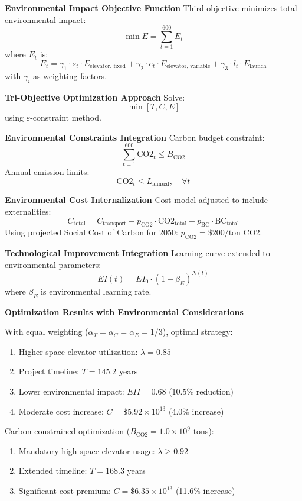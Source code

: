 \documentclass[12pt]{mcmthesis}
\begin{document}
\textbf{Environmental Impact Objective Function}
Third objective minimizes total environmental impact:
\[
    \min E = \sum_{t=1}^{600} E_t
\]
where $E_t$ is:
\[
    E_t = \gamma_1 \cdot s_t \cdot E_{\text{elevator, fixed}} + \gamma_2 \cdot e_t \cdot E_{\text{elevator, variable}} + \gamma_3 \cdot l_t \cdot E_{\text{launch}}
\]
with $\gamma_i$ as weighting factors.

\textbf{Tri-Objective Optimization Approach}
Solve:
\[
    \min \left[ T, C, E \right]
\]
using $\varepsilon$-constraint method.

\textbf{Environmental Constraints Integration}
Carbon budget constraint:
\[
    \sum_{t=1}^{600} \text{CO2}_t \leq B_{\text{CO2}}
\]
Annual emission limits:
\[
    \text{CO2}_t \leq L_{\text{annual}}, \quad \forall t
\]

\textbf{Environmental Cost Internalization}
Cost model adjusted to include externalities:
\[
    C_{\text{total}} = C_{\text{transport}} + p_{\text{CO2}} \cdot \text{CO2}_{\text{total}} + p_{\text{BC}} \cdot \text{BC}_{\text{total}}
\]
Using projected Social Cost of Carbon for 2050: $p_{\text{CO2}} = \$200/\text{ton CO2}$.

    \textbf{Technological Improvement Integration}
    Learning curve extended to environmental parameters:
    \[
        EI(t) = EI_0 \cdot (1 - \beta_E)^{N(t)}
    \]
    where $\beta_E$ is environmental learning rate.

    \textbf{Optimization Results with Environmental Considerations}

    With equal weighting ($\alpha_T = \alpha_C = \alpha_E = 1/3$), optimal strategy:
    \begin{enumerate}
        \item Higher space elevator utilization: $\lambda = 0.85$
        \item Project timeline: $T = 145.2$ years
        \item Lower environmental impact: $EII = 0.68$ (10.5\% reduction)
        \item Moderate cost increase: $C = \$5.92 \times 10^{13}$ (4.0\% increase)
    \end{enumerate}

    Carbon-constrained optimization ($B_{\text{CO2}} = 1.0 \times 10^9$ tons):
    \begin{enumerate}
        \item Mandatory high space elevator usage: $\lambda \geq 0.92$
        \item Extended timeline: $T = 168.3$ years
        \item Significant cost premium: $C = \$6.35 \times 10^{13}$ (11.6\% increase)
    \end{enumerate}
\end{document}
